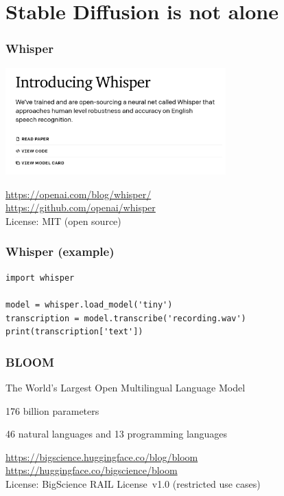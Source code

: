 \documentclass[17pt,aspectratio=169,hyperref={pdfusetitle,colorlinks,allcolors=olive}]{beamer}
\begin{document}
\section{Stable Diffusion is not alone}

\begin{frame}[fragile]
  \frametitle{Whisper}

  \includegraphics[width=8.5cm]{figs/whisper}

  \begin{flushright}
    {\scriptsize
    \url{https://openai.com/blog/whisper/} \\
    \url{https://github.com/openai/whisper} \\
    License: MIT (open source) \\
  }
  \end{flushright}

\end{frame}


\begin{frame}[fragile]
  \frametitle{Whisper (example)}

{\small
\begin{verbatim}
import whisper

model = whisper.load_model('tiny')
transcription = model.transcribe('recording.wav')
print(transcription['text'])
\end{verbatim}
}

\end{frame}


\begin{frame}[fragile]
  \frametitle{BLOOM}

  The World’s Largest Open Multilingual Language Model  

  176 billion parameters

  46 natural languages and 13 programming languages

  \begin{flushright}
    {\small
    \url{https://bigscience.huggingface.co/blog/bloom} \\
    \url{https://huggingface.co/bigscience/bloom} \\ }
    License: BigScience RAIL License v1.0 (restricted use cases) \\
  \end{flushright}

\end{frame}
\end{document}
